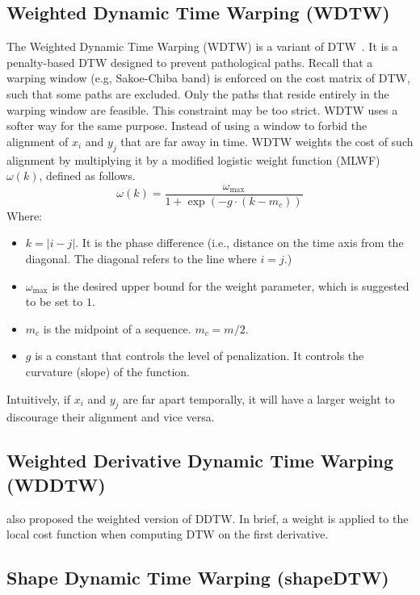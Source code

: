 \subsection{Weighted Dynamic Time Warping (WDTW)} %

The Weighted Dynamic Time Warping (WDTW) is a variant of DTW~\cite{jeong2011weighted}. 
It is a penalty-based DTW designed to prevent pathological paths.
Recall that a warping window (e.g, Sakoe-Chiba band) is enforced on the cost matrix of DTW, such that some paths are excluded.
Only the paths that reside entirely in the warping window are feasible.
This constraint may be too strict.
WDTW uses a softer way for the same purpose.
Instead of using a window to forbid the alignment of $x_i$ and $y_j$ that are far away in time.
WDTW weights the cost of such alignment by multiplying it by a modified logistic weight function (MLWF) $\omega(k)$, defined as follows.
\begin{equation} 
    \omega(k) = \frac{\omega_{\max}}{1 + \exp{(-g\cdot(k-m_c))}}
\end{equation}
Where:
\begin{itemize}
  \item $k = |i - j|$. It is the phase difference (i.e., distance on the time axis from the diagonal. The diagonal refers to the line where $i = j$.)
  \item $\omega_{\max}$ is the desired upper bound for the weight parameter, which is suggested to be set to $1$.
  \item $m_c$ is the midpoint of a sequence. $m_c = m/2$.
  \item $g$ is a constant that controls the level of penalization. It controls the curvature (slope) of the function.
\end{itemize}
Intuitively, if $x_i$ and $y_j$ are far apart temporally, it will have a larger weight to discourage their alignment and vice versa.

\subsection{Weighted Derivative Dynamic Time Warping (WDDTW)} %

\cite{jeong2011weighted} also proposed the weighted version of DDTW. 
In brief, a weight is applied to the local cost function when computing DTW on the first derivative.

\subsection{Shape Dynamic Time Warping (shapeDTW)} %


